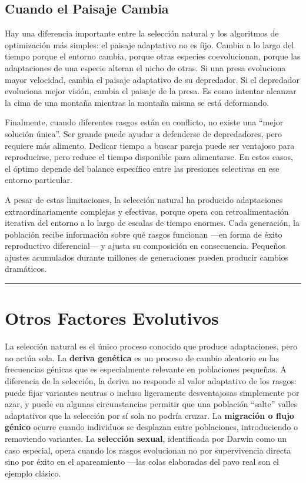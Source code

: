 \documentclass[
  letterpaper,
  DIV=11,
  numbers=noendperiod]{scrreprt}
\begin{document}
\subsection{Cuando el Paisaje Cambia}\label{cuando-el-paisaje-cambia}

Hay una diferencia importante entre la selección natural y los
algoritmos de optimización más simples: el paisaje adaptativo no es
fijo. Cambia a lo largo del tiempo porque el entorno cambia, porque
otras especies coevolucionan, porque las adaptaciones de una especie
alteran el nicho de otras. Si una presa evoluciona mayor velocidad,
cambia el paisaje adaptativo de su depredador. Si el depredador
evoluciona mejor visión, cambia el paisaje de la presa. Es como intentar
alcanzar la cima de una montaña mientras la montaña misma se está
deformando.

Finalmente, cuando diferentes rasgos están en conflicto, no existe una
``mejor solución única''. Ser grande puede ayudar a defenderse de
depredadores, pero requiere más alimento. Dedicar tiempo a buscar pareja
puede ser ventajoso para reproducirse, pero reduce el tiempo disponible
para alimentarse. En estos casos, el óptimo depende del balance
específico entre las presiones selectivas en ese entorno particular.

A pesar de estas limitaciones, la selección natural ha producido
adaptaciones extraordinariamente complejas y efectivas, porque opera con
retroalimentación iterativa del entorno a lo largo de escalas de tiempo
enormes. Cada generación, la población recibe información sobre qué
rasgos funcionan ---en forma de éxito reproductivo diferencial--- y
ajusta su composición en consecuencia. Pequeños ajustes acumulados
durante millones de generaciones pueden producir cambios dramáticos.

\begin{center}\rule{0.5\linewidth}{0.5pt}\end{center}

\section{Otros Factores Evolutivos}\label{otros-factores-evolutivos}

La selección natural es el único proceso conocido que produce
adaptaciones, pero no actúa sola. La \textbf{deriva genética} es un
proceso de cambio aleatorio en las frecuencias génicas que es
especialmente relevante en poblaciones pequeñas. A diferencia de la
selección, la deriva no responde al valor adaptativo de los rasgos:
puede fijar variantes neutras o incluso ligeramente desventajosas
simplemente por azar, y puede en algunas circunstancias permitir que una
población ``salte'' valles adaptativos que la selección por sí sola no
podría cruzar. La \textbf{migración o flujo génico} ocurre cuando
individuos se desplazan entre poblaciones, introduciendo o removiendo
variantes. La \textbf{selección sexual}, identificada por Darwin como un
caso especial, opera cuando los rasgos evolucionan no por supervivencia
directa sino por éxito en el apareamiento ---las colas elaboradas del
pavo real son el ejemplo clásico.
\end{document}

